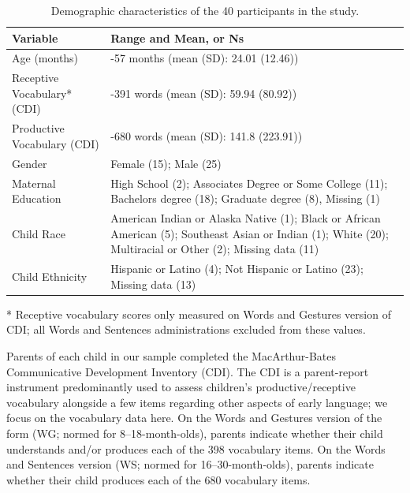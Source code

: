 \documentclass[
  man,floatsintext]{apa6}
\begin{document}
\begin{table}[H]

\begin{threeparttable}
\caption{\label{tab:demographics-table}Demographic characteristics of the 40 participants in the study.}
\centering
\begin{tabular}[t]{l|>{\raggedright\arraybackslash}p{4in}}
\hline
Variable & Range and Mean, or Ns\\
\hline
Age (months) & 7-57 months (mean (SD): 24.01 (12.46))\\
\hline
Receptive Vocabulary* (CDI) & 0-391 words (mean (SD): 59.94 (80.92))\\
\hline
Productive Vocabulary (CDI) & 0-680 words (mean (SD): 141.8 (223.91))\\
\hline
Gender & Female (15); Male (25)\\
\hline
Maternal Education & High School (2); Associates Degree or Some College (11); Bachelors degree (18); Graduate degree (8), Missing (1)\\
\hline
Child Race & American Indian or Alaska Native (1); Black or African American (5); Southeast Asian or Indian (1); White (20); Multiracial or Other (2); Missing data (11)\\
\hline
Child Ethnicity & Hispanic or Latino (4); Not Hispanic or Latino (23); Missing data (13)\\
\hline
\end{tabular}
\begin{tablenotes}
\small
\item [*] Receptive vocabulary scores only measured on Words and Gestures version of CDI; all Words and Sentences administrations excluded from these values.
\end{tablenotes}
\end{threeparttable}
\end{table}

Parents of each child in our sample completed the MacArthur-Bates Communicative Development Inventory (CDI). The CDI is a parent-report instrument predominantly used to assess children's productive/receptive vocabulary alongside a few items regarding other aspects of early language; we focus on the vocabulary data here. On the Words and Gestures version of the form (WG; normed for 8--18-month-olds), parents indicate whether their child understands and/or produces each of the 398 vocabulary items. On the Words and Sentences version (WS; normed for 16--30-month-olds), parents indicate whether their child produces each of the 680 vocabulary items.
\end{document}
